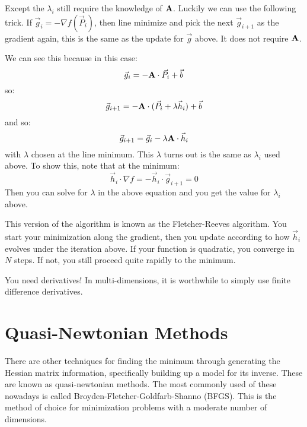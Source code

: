 Except the $\lambda_i$ still require the knowledge of
${\bf A}$. Luckily we can use the following trick. If $\vec{g}_i = -
\nabla f(\vec{P}_i)$, then line minimize and pick the next
$\vec{g}_{i+1}$ as the gradient again, this is the same as the update
for $\vec{g}$ above. It does not require ${\bf A}$.

We can see this because in this case:
\begin{equation}
\vec{g}_i = - {\bf A}\cdot\vec{P}_i + \vec{b}
\end{equation}
so:
\begin{equation}
\vec{g}_{i+1} = - {\bf A}\cdot (\vec{P}_i + \lambda \vec{h}_i) + \vec{b}
\end{equation}
and so:
\begin{equation}
\vec{g}_{i+1} = \vec{g}_i - \lambda {\bf A}\cdot\vec{h}_i
\end{equation}
with $\lambda$ chosen at the line minimum. This $\lambda$ turns out is
the same as $\lambda_i$ used above. To show this, note that at the
minimum:
\begin{equation}
  \vec{h}_i\cdot \nabla f = -\vec{h}_i \cdot \vec{g}_{i+1}  = 0
\end{equation}
Then you can solve for $\lambda$ in the above equation and you get the
value for $\lambda_i$ above.

This version of the algorithm is known as the Fletcher-Reeves
algorithm. You start your minimization along the gradient, then you
update according to how $\vec{h}_i$ evolves under the iteration
above. If your function is quadratic, you converge in $N$ steps. If
not, you still proceed quite rapidly to the minimum.

You need derivatives! In multi-dimensions, it is worthwhile to simply
use finite difference derivatives.

\section{Quasi-Newtonian Methods}

There are other techniques for finding the minimum through generating
the Hessian matrix information, specifically building up a model for
its inverse. These are known as quasi-newtonian methods. The most
commonly used of these nowadays is called
Broyden-Fletcher-Goldfarb-Shanno (BFGS).  This is the method of choice
for minimization problems with a moderate number of dimensions.
